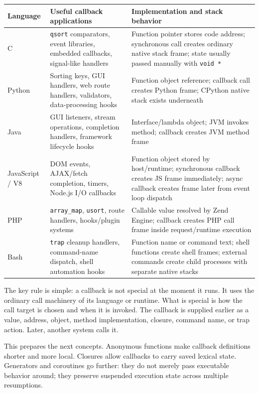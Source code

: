 \documentclass[a4paper,twoside]{report}
\begin{document}
\begin{center}
\begin{tabular}{|p{}|p{}|p{}|}
\hline
\textbf{Language} & \textbf{Useful callback applications} & \textbf{Implementation and stack behavior} \\
\hline
C & \texttt{qsort} comparators, event libraries, embedded callbacks, signal-like handlers & Function pointer stores code address; synchronous call creates ordinary native stack frame; state usually passed manually with \texttt{void *} \\
\hline
Python & Sorting keys, GUI handlers, web route handlers, validators, data-processing hooks & Function object reference; callback call creates Python frame; CPython native stack exists underneath \\
\hline
Java & GUI listeners, stream operations, completion handlers, framework lifecycle hooks & Interface/lambda object; JVM invokes method; callback creates JVM method frame \\
\hline
JavaScript / V8 & DOM events, AJAX/fetch completion, timers, Node.js I/O callbacks & Function object stored by host/runtime; synchronous callback creates JS frame immediately; async callback creates frame later from event loop dispatch \\
\hline
PHP & \texttt{array\_map}, \texttt{usort}, route handlers, hooks/plugin systems & Callable value resolved by Zend Engine; callback creates PHP call frame inside request/runtime execution \\
\hline
Bash & \texttt{trap} cleanup handlers, command-name dispatch, shell automation hooks & Function name or command text; shell functions create shell frames; external commands create child processes with separate native stacks \\
\hline
\end{tabular}
\end{center}

The key rule is simple: a callback is not special at the moment it runs. It uses the ordinary call machinery of its language or runtime. What is special is how the call target is chosen and when it is invoked. The callback is supplied earlier as a value, address, object, method implementation, closure, command name, or trap action. Later, another system calls it.

This prepares the next concepts. Anonymous functions make callback definitions shorter and more local. Closures allow callbacks to carry saved lexical state. Generators and coroutines go further: they do not merely pass executable behavior around; they preserve suspended execution state across multiple resumptions.
\end{document}
